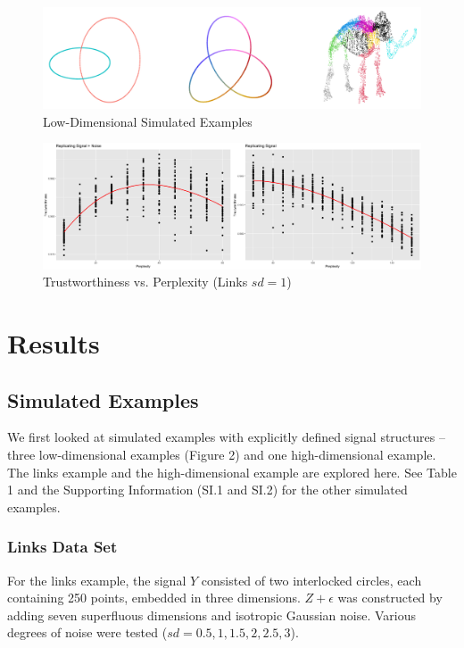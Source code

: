 \documentclass{article}
\begin{document}
\renewcommand{\thefigure}{2}
\begin{figure}[t]
\centering
\includegraphics[scale=0.5]{simulated_examples}
\caption{Low-Dimensional Simulated Examples}
\end{figure}

\renewcommand{\thefigure}{3}
\begin{figure}[b]
\centering
\includegraphics[scale=0.22]{trust_plot_links}
\caption{Trustworthiness vs. Perplexity (Links $sd = 1$)}
\end{figure}

\section{Results}

\subsection{Simulated Examples}
We first looked at simulated examples with explicitly defined signal structures -- three low-dimensional examples (Figure 2) and one high-dimensional example. The links example and the high-dimensional example are explored here. See Table 1 and the Supporting Information (SI.1 and SI.2) for the other simulated examples.

\subsubsection{Links Data Set}
For the links example, the signal $Y$ consisted of two interlocked circles, each containing 250 points, embedded in three dimensions. $Z + \epsilon$ was constructed by adding seven superfluous dimensions and isotropic Gaussian noise. Various degrees of noise were tested ($sd = 0.5, 1, 1.5, 2, 2.5, 3$).
\end{document}

